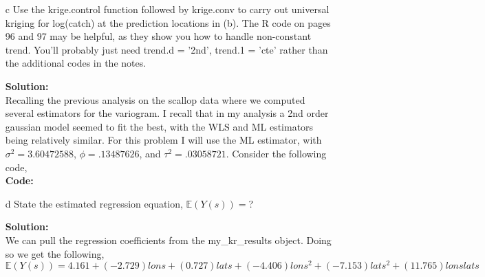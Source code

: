 \documentclass[12pt]{article}
\makeatletter
\theoremstyle{homework}
\newenvironment{exercise}[1]
{\def\@currentlabel{#1}\exercisecore}
{\endexercisecore}
\newcommand{\localhead}[1]{\par\smallskip\noindent\textbf{#1}\nobreak\\}%
\newcommand\solution{\localhead{Solution:}}
\makeatother
\begin{document}
\begin{exercise}{2}
\begin{enumerate}
    \item[c] Use the krige.control function followed by krige.conv to carry out universal kriging for log(catch)
    at the prediction locations in (b). The R code on pages 96 and 97 may be helpful, as they show you how to handle non-constant trend. 
    You'll probably just need trend.d = '2nd', trend.1 = 'cte' rather than the additional codes in the notes.\\
    \solution Recalling the previous analysis on the scallop data where we computed several estimators for the variogram. I recall that 
    in my analysis a 2nd order gaussian model seemed to fit the best, with the WLS and ML estimators being relatively similar. For this problem 
    I will use the ML estimator, with $\sigma^2 = 3.60472588$, $\phi = .13487626$, and $\tau^2 = .03058721$. Consider the following code,\\
    \textbf{Code:}
    \begin{center}
    
    \end{center}
    \vspace{.15in}

    
    \item[d] State the estimated regression equation, $\mathbb{E}(Y(s)) = $?\\
    \solution We can pull the regression coefficients from the my\_kr\_results object. Doing so we get the following, 
    \begin{equation*}
      \mathbb{E}(Y(s)) = 4.161 + (-2.729)lons + (0.727)lats + (-4.406)lons^2 + (-7.153)lats^2 + (11.765)lonslats 
    \end{equation*} 
    \vspace{.15in}





\end{enumerate}
\end{exercise}
\end{document}
